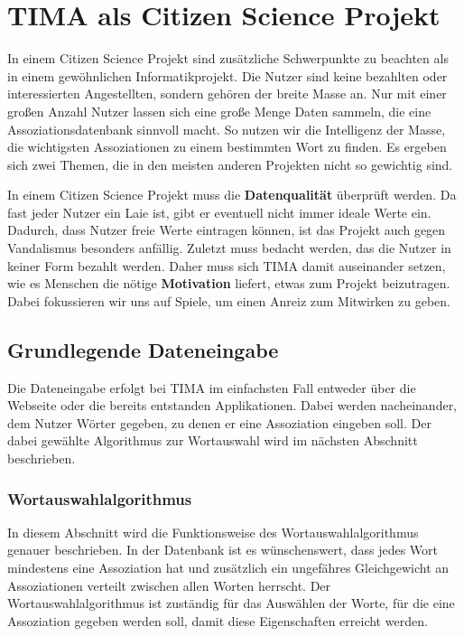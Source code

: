 \chapter{TIMA als Citizen Science Projekt}

In einem Citizen Science Projekt sind zusätzliche Schwerpunkte zu beachten als in einem gewöhnlichen Informatikprojekt. Die Nutzer sind keine bezahlten oder interessierten Angestellten, sondern gehören der breite Masse an. Nur mit einer großen Anzahl Nutzer lassen sich eine große Menge Daten sammeln, die eine Assoziationsdatenbank sinnvoll macht. So nutzen wir die Intelligenz der Masse, die wichtigsten Assoziationen zu einem bestimmten Wort zu finden. Es ergeben sich zwei Themen, die in den meisten anderen Projekten nicht so gewichtig sind.

In einem Citizen Science Projekt muss die \textbf{Datenqualität} überprüft werden. Da fast jeder Nutzer ein Laie ist, gibt er eventuell nicht immer ideale Werte ein. Dadurch, dass Nutzer freie Werte eintragen können, ist das Projekt auch gegen Vandalismus besonders anfällig. Zuletzt muss bedacht werden, das die Nutzer in keiner Form bezahlt werden. Daher muss sich TIMA damit auseinander setzen, wie es Menschen die nötige \textbf{Motivation} liefert, etwas zum Projekt beizutragen. Dabei fokussieren wir uns auf Spiele, um einen Anreiz zum Mitwirken zu geben.

\section{Grundlegende Dateneingabe}
Die Dateneingabe erfolgt bei TIMA im einfachsten Fall entweder über die Webseite oder die bereits entstanden Applikationen. Dabei werden nacheinander, dem Nutzer Wörter gegeben, zu denen er eine Assoziation eingeben soll. Der dabei gewählte Algorithmus zur Wortauswahl wird im nächsten Abschnitt beschrieben.

\subsection{Wortauswahlalgorithmus}\label{subsec:Wortauswahlalgorithmus}
In diesem Abschnitt wird die Funktionsweise des Wortauswahlalgorithmus genauer beschrieben. In der Datenbank ist es wünschenswert, dass jedes Wort mindestens eine Assoziation hat und zusätzlich ein ungefähres Gleichgewicht an Assoziationen verteilt zwischen allen Worten herrscht. Der Wortauswahlalgorithmus ist zuständig für das Auswählen der Worte, für die eine Assoziation gegeben werden soll, damit diese Eigenschaften erreicht werden.

